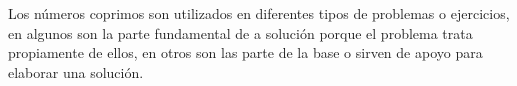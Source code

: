 Los números coprimos son utilizados en diferentes tipos de problemas o ejercicios, en algunos son la parte fundamental de a solución porque el problema trata propiamente de ellos, en otros son las parte de la base o sirven de apoyo para elaborar una solución.